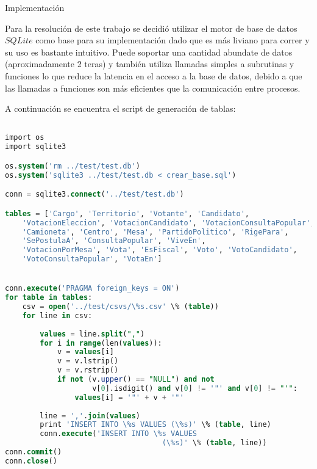 \begin{section}{Implementaci\'on}

Para la resoluci\'on de este trabajo se decidi\'o utilizar el motor de base de datos $SQLite$ como base para su implementaci\'on dado que es m\'as liviano para correr y su uso es bastante intuitivo. Puede soportar una cantidad abundate de datos (aproximadamente 2 teras) y tambi\'en utiliza llamadas simples a subrutinas y funciones lo que reduce la latencia en el acceso a la base de datos, debido a que las llamadas a funciones son más eficientes que la comunicación entre procesos. 

A continuaci\'on se encuentra el script de generaci\'on de tablas:

\begin{lstlisting}[language=SQL]

import os
import sqlite3

os.system('rm ../test/test.db')
os.system('sqlite3 ../test/test.db < crear_base.sql')

conn = sqlite3.connect('../test/test.db')

tables = ['Cargo', 'Territorio', 'Votante', 'Candidato', 
	'VotacionEleccion', 'VotacionCandidato', 'VotacionConsultaPopular', 
	'Camioneta', 'Centro', 'Mesa', 'PartidoPolitico', 'RigePara', 
	'SePostulaA', 'ConsultaPopular', 'ViveEn', 
	'VotacionPorMesa', 'Vota', 'EsFiscal', 'Voto', 'VotoCandidato', 
	'VotoConsultaPopular', 'VotaEn']


conn.execute('PRAGMA foreign_keys = ON')
for table in tables:
	csv = open('../test/csvs/\%s.csv' \% (table))
	for line in csv:
		
		values = line.split(",")		
		for i in range(len(values)):
			v = values[i]			
			v = v.lstrip()
			v = v.rstrip()						
			if not (v.upper() == "NULL") and not 
					v[0].isdigit() and v[0] != '"' and v[0] != "'":
				values[i] = '"' + v + '"'
		
		line = ','.join(values)				
		print 'INSERT INTO \%s VALUES (\%s)' \% (table, line)
		conn.execute('INSERT INTO \%s VALUES 
									(\%s)' \% (table, line))
conn.commit()
conn.close()

\end{lstlisting} 

\end{section}

